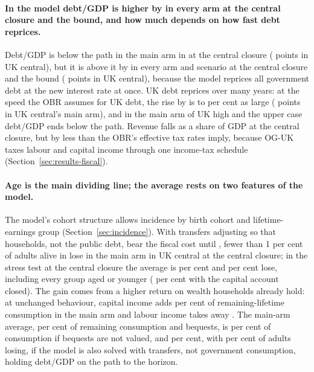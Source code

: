 \paragraph{In the model debt/GDP is higher by \genDebtRuleYear{} in every arm at the central closure and the bound, and how much depends on how fast debt reprices.} Debt/GDP is below the path in the main arm in \genHeadYear{} at the central closure (\genUkCentralMainDebtPpCentral{} points in UK central), but it is above it by \genDebtRuleYear{} in every arm and scenario at the central closure and the bound (\genUkCentralMainDebtPpThirtySixCentral{} points in UK central), because the model reprices all government debt at the new interest rate at once. UK debt reprices over many years: at the speed the OBR assumes for UK debt, the rise by \genDebtRuleYear{} is \genRepriceRatioMinPct{} to \genRepriceRatioMaxPct{} per cent as large (\genUkCentralMainDebtRepricedThirtySixCentral{} points in UK central's main arm), and in the main arm of UK high and the upper case debt/GDP ends below the path. Revenue falls as a share of GDP at the central closure, but by less than the OBR's effective tax rates imply, because OG-UK taxes labour and capital income through one income-tax schedule (Section~\ref{sec:results-fiscal}).

\paragraph{Age is the main dividing line; the average rests on two features of the model.} The model's cohort structure allows incidence by birth cohort and lifetime-earnings group (Section~\ref{sec:incidence}). With transfers adjusting so that households, not the public debt, bear the fiscal cost until \genLastFlowYear{}, fewer than 1 per cent of adults alive in \genShockYear{} lose in the main arm in UK central at the central closure; in the stress test at the central closure the average is \genCohStressDnCentralAvg{} per cent and \genCohStressDnCentralLosingPct{} per cent lose, including every group aged \genCohStressDnCentralAllLoseUpToAge{} or younger (\genCohStressDnBoundLosingPct{} per cent with the capital account closed). The gain comes from a higher return on wealth households already hold: at unchanged behaviour, capital income adds \genCohMainDnCentralSrcCap{} per cent of remaining-lifetime consumption in the main arm and labour income takes away \genCohMainDnCentralSrcLabAbs{}. The main-arm average, \genCohMainDnCentralAvgShort{} per cent of remaining consumption and bequests, is \genCohMainDnCentralNoBeqAvgShort{} per cent of consumption if bequests are not valued, and \genCohMainDnfullCentralNoBeqAvgRange{} per cent, with \genCohMainDnfullCentralNoBeqLosingPctRange{} per cent of adults losing, if the model is also solved with transfers, not government consumption, holding debt/GDP on the path to the horizon.

